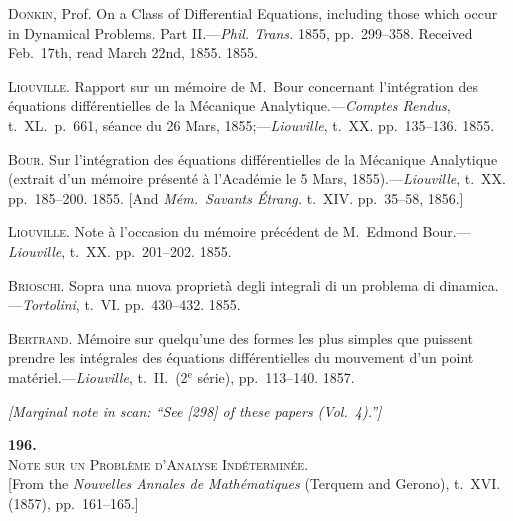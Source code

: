 \documentclass[11pt]{article}
\begin{document}

\begin{flushleft}
\textsc{Donkin}, Prof. \;On a Class of Differential Equations, including those which occur in Dynamical Problems. Part II.---\emph{Phil. Trans.} 1855, pp.\ 299--358. Received Feb.\ 17th, read March 22nd, 1855. 1855.

\medskip
\textsc{Liouville}. \;Rapport sur un m\'emoire de M.\ Bour concernant l'int\'egration des \'equations diff\'erentielles de la M\'ecanique Analytique.---\emph{Comptes Rendus}, t.\ XL.\ p.\ 661, s\'eance du 26 Mars, 1855;---\emph{Liouville}, t.\ XX. pp.\ 135--136. 1855.

\medskip
\textsc{Bour}. \;Sur l'int\'egration des \'equations diff\'erentielles de la M\'ecanique Analytique (extrait d'un m\'emoire pr\'esent\'e \`a l'Acad\'emie le 5 Mars, 1855).---\emph{Liouville}, t.\ XX. pp.\ 185--200. 1855. [And \emph{M\'em.\ Savants \'Etrang.} t.\ XIV. pp.\ 35--58, 1856.]

\medskip
\textsc{Liouville}. \;Note \`a l'occasion du m\'emoire pr\'ec\'edent de M.\ Edmond Bour.---\emph{Liouville}, t.\ XX. pp.\ 201--202. 1855.

\medskip
\textsc{Brioschi}. \;Sopra una nuova propriet\`a degli integrali di un problema di dinamica.---\emph{Tortolini}, t.\ VI. pp.\ 430--432. 1855.

\medskip
\textsc{Bertrand}. \;M\'emoire sur quelqu'une des formes les plus simples que puissent prendre les int\'egrales des \'equations diff\'erentielles du mouvement d'un point mat\'eriel.---\emph{Liouville}, t.\ II.\ (2$^{\mathrm{e}}$ s\'erie), pp.\ 113--140. 1857.
\end{flushleft}

\bigskip
\textit{[Marginal note in scan: ``See [298] of these papers (Vol.\ 4).'']}

\clearpage


\begin{center}
\textbf{\large 196.}\\[6pt]
\textsc{Note sur un Probl\`eme d'Analyse Ind\'etermin\'ee.}\\[4pt]
\small [From the \emph{Nouvelles Annales de Math\'ematiques} (Terquem and Gerono), t.\ XVI. (1857), pp.\ 161--165.]
\end{center}
\end{document}
